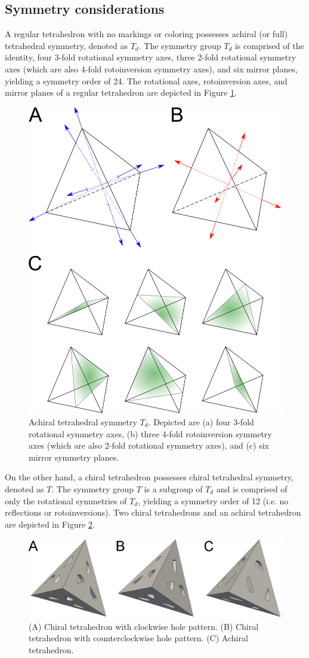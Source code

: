 \documentclass{article}
\begin{document}
\subsection{Symmetry considerations}
A regular tetrahedron with no markings or coloring possesses achiral (or full) tetrahedral symmetry, denoted as $T_d$. The symmetry group $T_d$ is comprised of the identity, four 3-fold rotational symmetry axes, three 2-fold rotational symmetry axes (which are also 4-fold rotoinversion symmetry axes), and six mirror planes, yielding a symmetry order of 24. The rotational axes, rotoinversion axes, and mirror planes of a regular tetrahedron are depicted in Figure \ref{fig:achiral_tetrahedron_symmetry}.
\begin{figure}
    \centering
    \includegraphics[width=0.5\linewidth]{figures/achiral_tetrahedron_symmetry.eps}
    \caption{Achiral tetrahedral symmetry $T_d$. Depicted are (a) four 3-fold rotational symmetry axes, (b) three 4-fold rotoinversion symmetry axes (which are also 2-fold rotational symmetry axes), and (c) six mirror symmetry planes.}
    \label{fig:achiral_tetrahedron_symmetry}
\end{figure}
On the other hand, a chiral tetrahedron possesses chiral tetrahedral symmetry, denoted as $T$. The symmetry group $T$ is a subgroup of $T_d$ and is comprised of only the rotational symmetries of $T_d$, yielding a symmetry order of 12 (i.e. no reflections or rotoinversions). Two chiral tetrahedrons and an achiral tetrahedron are depicted in Figure \ref{fig:chiral_achiral_tetrahedron}.
\begin{figure}
    \centering
    \includegraphics[width=0.5\linewidth]{figures/chiral_achiral_tetrahedron.eps}
    \caption{(A) Chiral tetrahedron with clockwise hole pattern. (B) Chiral tetrahedron with counterclockwise hole pattern. (C) Achiral tetrahedron.}
    \label{fig:chiral_achiral_tetrahedron}
\end{figure}
\end{document}
